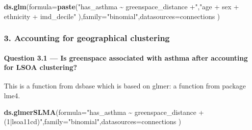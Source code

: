 \documentclass[
]{article}
\newenvironment{Shaded}{\begin{snugshade}}{\end{snugshade}}
\newcommand{\AttributeTok}[1]{\textcolor[rgb]{0.13,0.29,0.53}{#1}}
\newcommand{\FunctionTok}[1]{\textcolor[rgb]{0.13,0.29,0.53}{\textbf{#1}}}
\newcommand{\NormalTok}[1]{#1}
\newcommand{\StringTok}[1]{\textcolor[rgb]{0.31,0.60,0.02}{#1}}
\begin{document}
\begin{Shaded}
\begin{Highlighting}[]
\FunctionTok{ds.glm}\NormalTok{(}\AttributeTok{formula=}\FunctionTok{paste}\NormalTok{(}\StringTok{"has\_asthma \textasciitilde{} greenspace\_distance +"}\NormalTok{,}\StringTok{"age + sex + ethnicity + imd\_decile"}
\NormalTok{  ),}\AttributeTok{family=}\StringTok{"binomial"}\NormalTok{,}\AttributeTok{datasources=}\NormalTok{connections}
\NormalTok{)}
\end{Highlighting}
\end{Shaded}

\subsubsection{3. Accounting for geographical
clustering}\label{accounting-for-geographical-clustering}

\paragraph{Question 3.1 --- Is greenspace associated with asthma after
accounting for LSOA
clustering?}\label{question-3.1-is-greenspace-associated-with-asthma-after-accounting-for-lsoa-clustering}

This is a function from dsbase which is based on glmer: a function from
package lme4.

\begin{Shaded}
\begin{Highlighting}[]
\FunctionTok{ds.glmerSLMA}\NormalTok{(}\AttributeTok{formula=}\StringTok{"has\_asthma \textasciitilde{} greenspace\_distance + (1|lsoa11cd)"}\NormalTok{,}\AttributeTok{family=}\StringTok{"binomial"}\NormalTok{,}\AttributeTok{datasources=}\NormalTok{connections}
\NormalTok{)}
\end{Highlighting}
\end{Shaded}
\end{document}
